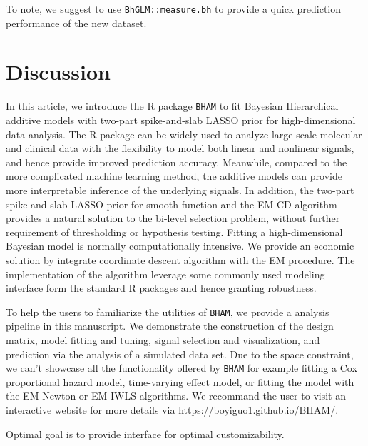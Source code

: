 \documentclass[
]{jss}
\begin{document}
To note, we suggest to use \texttt{BhGLM::measure.bh} to provide a quick
prediction performance of the new dataset.

\begin{CodeChunk}
\end{CodeChunk}

\section{Discussion}

In this article, we introduce the R package \texttt{BHAM} to fit
Bayesian Hierarchical additive models with two-part spike-and-slab LASSO
prior for high-dimensional data analysis. The R package can be widely
used to analyze large-scale molecular and clinical data with the
flexibility to model both linear and nonlinear signals, and hence
provide improved prediction accuracy. Meanwhile, compared to the more
complicated machine learning method, the additive models can provide
more interpretable inference of the underlying signals. In addition, the
two-part spike-and-slab LASSO prior for smooth function and the EM-CD
algorithm provides a natural solution to the bi-level selection problem,
without further requirement of thresholding or hypothesis testing.
Fitting a high-dimensional Bayesian model is normally computationally
intensive. We provide an economic solution by integrate coordinate
descent algorithm with the EM procedure. The implementation of the
algorithm leverage some commonly used modeling interface form the
standard R packages and hence granting robustness.

To help the users to familiarize the utilities of \texttt{BHAM}, we
provide a analysis pipeline in this manuscript. We demonstrate the
construction of the design matrix, model fitting and tuning, signal
selection and visualization, and prediction via the analysis of a
simulated data set. Due to the space constraint, we can't showcase all
the functionality offered by \texttt{BHAM} for example fitting a Cox
proportional hazard model, time-varying effect model, or fitting the
model with the EM-Newton or EM-IWLS algorithms. We recommand the user to
visit an interactive website for more details via
\url{https://boyiguo1.github.io/BHAM/}.

Optimal goal is to provide interface for optimal customizability.

\clearpage


\end{document}
